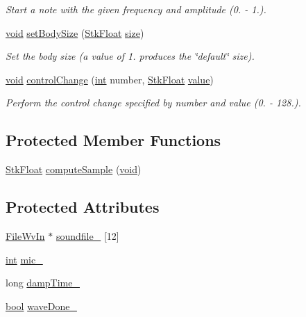 \begin{DoxyCompactItemize}
\begin{DoxyCompactList}\small\item\em Start a note with the given frequency and amplitude (0. -\/ 1.). \end{DoxyCompactList}\item 
\hyperlink{sound_8c_ae35f5844602719cf66324f4de2a658b3}{void} \hyperlink{class_nyq_1_1_mandolin_a258aaaed5fbbdbe8bacb38234cb47db7}{set\+Body\+Size} (\hyperlink{namespace_nyq_a044fa20a706520a617bbbf458a7db7e4}{Stk\+Float} \hyperlink{group__lavu__mem_ga854352f53b148adc24983a58a1866d66}{size})
\begin{DoxyCompactList}\small\item\em Set the body size (a value of 1. produces the \char`\"{}default\char`\"{} size). \end{DoxyCompactList}\item 
\hyperlink{sound_8c_ae35f5844602719cf66324f4de2a658b3}{void} \hyperlink{class_nyq_1_1_mandolin_a4fa3e5711f31e2f1535f15980726776d}{control\+Change} (\hyperlink{xmltok_8h_a5a0d4a5641ce434f1d23533f2b2e6653}{int} number, \hyperlink{namespace_nyq_a044fa20a706520a617bbbf458a7db7e4}{Stk\+Float} \hyperlink{lib_2expat_8h_a4a30a13b813682e68c5b689b45c65971}{value})
\begin{DoxyCompactList}\small\item\em Perform the control change specified by {\itshape number} and {\itshape value} (0. -\/ 128.). \end{DoxyCompactList}\end{DoxyCompactItemize}
\subsection*{Protected Member Functions}
\begin{DoxyCompactItemize}
\item 
\hyperlink{namespace_nyq_a044fa20a706520a617bbbf458a7db7e4}{Stk\+Float} \hyperlink{class_nyq_1_1_mandolin_aacaa7f31cad443d1393719401baf515e}{compute\+Sample} (\hyperlink{sound_8c_ae35f5844602719cf66324f4de2a658b3}{void})
\end{DoxyCompactItemize}
\subsection*{Protected Attributes}
\begin{DoxyCompactItemize}
\item 
\hyperlink{class_nyq_1_1_file_wv_in}{File\+Wv\+In} $\ast$ \hyperlink{class_nyq_1_1_mandolin_ae00de9a01d218beca7c004e266156b3b}{soundfile\+\_\+} \mbox{[}12\mbox{]}
\item 
\hyperlink{xmltok_8h_a5a0d4a5641ce434f1d23533f2b2e6653}{int} \hyperlink{class_nyq_1_1_mandolin_ac90f22a7f1923efff67e6e0b3ad5e275}{mic\+\_\+}
\item 
long \hyperlink{class_nyq_1_1_mandolin_a5f202d7eb55bed29f6639169c1bb2992}{damp\+Time\+\_\+}
\item 
\hyperlink{mac_2config_2i386_2lib-src_2libsoxr_2soxr-config_8h_abb452686968e48b67397da5f97445f5b}{bool} \hyperlink{class_nyq_1_1_mandolin_aa072337723a7cb0bbcac8c3874d80d3b}{wave\+Done\+\_\+}
\end{DoxyCompactItemize}
